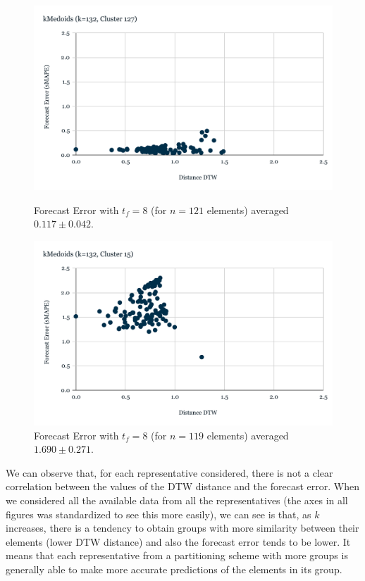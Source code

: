 \begin{figure}[!htbp]
  \centering
  \begin{minipage}[b]{0.45\textwidth}
    \includegraphics[width=\textwidth]{../Figures/distDTW_ForecastError_k132_c127}
    \caption{Forecast Error with $t_{f}=8$ (for $n=121$ elements) averaged $0.117 \pm 0.042$.}
    \label{Fig:DTWsMAPE_k132_c127}
  \end{minipage}
  \hfill
  \begin{minipage}[b]{0.45\textwidth}
    \includegraphics[width=\textwidth]{../Figures/distDTW_ForecastError_k132_c15}
    \caption{Forecast Error with $t_{f}=8$ (for $n=119$ elements) averaged $1.690 \pm 0.271$.}
    \label{Fig:DTWsMAPE_k132_c15}
  \end{minipage}
\end{figure}

\newpage
We can observe that, for each representative considered, there is not a clear correlation between the values of the DTW distance and the forecast error. When we considered all the available data from all the representatives (the axes in all figures was standardized to see this more easily), we can see is that, as $k$ increases, there is a tendency to obtain groups with more similarity between their elements (lower DTW distance) and also the forecast error tends to be lower. It means that each representative from a partitioning scheme with more groups is generally able to make more accurate predictions of the elements in its group.

